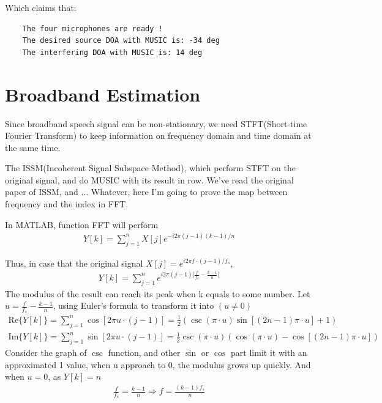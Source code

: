 \documentclass[UTF8]{article}
\begin{document}
Which claims that:
\begin{lstlisting}
    The four microphones are ready !
    The desired source DOA with MUSIC is: -34 deg
    The interfering DOA with MUSIC is: 14 deg
\end{lstlisting}

\section{Broadband Estimation}
\hspace{0.5em} Since broadband speech signal can be non-stationary, we need STFT(Short-time Fourier Transform) to keep information on frequency domain and time domain at the same time.

The ISSM(Incoherent Signal Subspace Method), which perform STFT on the original signal, and do MUSIC with its result in row. We've read the original paper of ISSM, and ... Whatever, here I'm going to prove the map between frequency and the index in FFT.

In MATLAB, function FFT will perform
\begin{gather}
    Y[k] = \sum_{j = 1}^{n}{X[j]}e^{-i 2\pi(j - 1)(k - 1)/n}
\end{gather}

Thus, in case that the original signal $X[j] = e^{i 2 \pi f \cdot (j - 1) / f_s}$, 
\begin{gather*}
    Y[k] = \sum_{j = 1}^{n}{e^{i 2 \pi (j - 1)\big[\frac{f}{f_s} - \frac{k - 1}{n}\big]}}
\end{gather*}
The modulus of the result can reach its peak when k equals to some number. Let $u = \frac{f}{f_s} - \frac{k - 1}{n}$, using Euler's formula to transform it into $(u \neq 0)$
\begin{gather*}
    \mathrm{Re}\{ Y[k] \} = \sum_{j = 1}^n{\cos[ 2 \pi u \cdot (j - 1)]} = \frac{1}{2}(\csc(\pi \cdot u) \sin[(2n - 1)\pi \cdot u] + 1) \\
\mathrm{Im}\{ Y[k] \} = \sum_{j = 1}^n{\sin[ 2 \pi u \cdot (j - 1)]} = \frac{1}{2}\csc(\pi \cdot u)(\cos(\pi \cdot u) - \cos[(2n - 1)\pi \cdot u])
\end{gather*}
Consider the graph of $\csc$ function, and other $\sin$ or $\cos$ part limit it with an approximated 1 value, when u approach to 0, the modulus grows up quickly. And when $u = 0$, as $Y[k] = n$
\begin{gather}
    \frac{f}{f_s} = \frac{k - 1}{n} \Rightarrow f = \frac{(k - 1)f_s}{n}
\end{gather}
\end{document}

